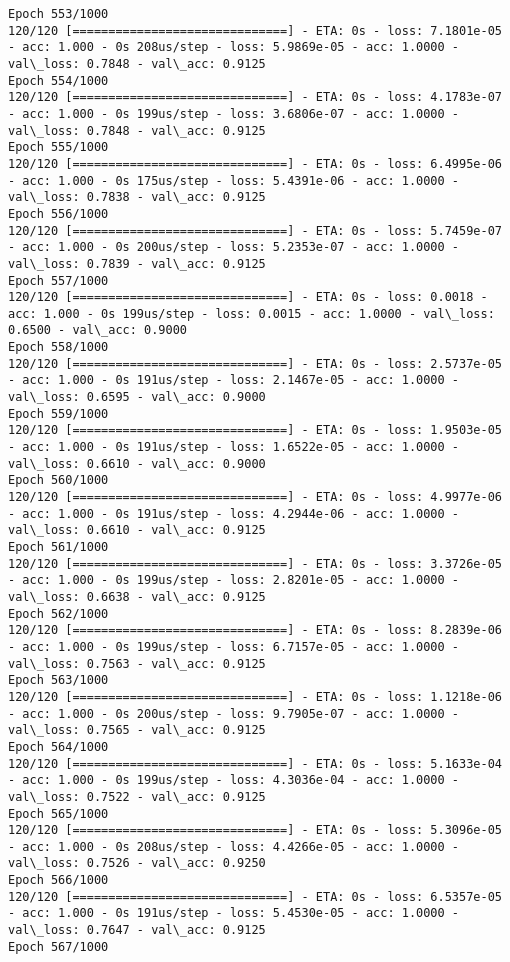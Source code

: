 \documentclass[11pt]{article}
\begin{document}
\begin{Verbatim}[commandchars=\\\{\}]
Epoch 553/1000
120/120 [==============================] - ETA: 0s - loss: 7.1801e-05 - acc: 1.000 - 0s 208us/step - loss: 5.9869e-05 - acc: 1.0000 - val\_loss: 0.7848 - val\_acc: 0.9125
Epoch 554/1000
120/120 [==============================] - ETA: 0s - loss: 4.1783e-07 - acc: 1.000 - 0s 199us/step - loss: 3.6806e-07 - acc: 1.0000 - val\_loss: 0.7848 - val\_acc: 0.9125
Epoch 555/1000
120/120 [==============================] - ETA: 0s - loss: 6.4995e-06 - acc: 1.000 - 0s 175us/step - loss: 5.4391e-06 - acc: 1.0000 - val\_loss: 0.7838 - val\_acc: 0.9125
Epoch 556/1000
120/120 [==============================] - ETA: 0s - loss: 5.7459e-07 - acc: 1.000 - 0s 200us/step - loss: 5.2353e-07 - acc: 1.0000 - val\_loss: 0.7839 - val\_acc: 0.9125
Epoch 557/1000
120/120 [==============================] - ETA: 0s - loss: 0.0018 - acc: 1.000 - 0s 199us/step - loss: 0.0015 - acc: 1.0000 - val\_loss: 0.6500 - val\_acc: 0.9000
Epoch 558/1000
120/120 [==============================] - ETA: 0s - loss: 2.5737e-05 - acc: 1.000 - 0s 191us/step - loss: 2.1467e-05 - acc: 1.0000 - val\_loss: 0.6595 - val\_acc: 0.9000
Epoch 559/1000
120/120 [==============================] - ETA: 0s - loss: 1.9503e-05 - acc: 1.000 - 0s 191us/step - loss: 1.6522e-05 - acc: 1.0000 - val\_loss: 0.6610 - val\_acc: 0.9000
Epoch 560/1000
120/120 [==============================] - ETA: 0s - loss: 4.9977e-06 - acc: 1.000 - 0s 191us/step - loss: 4.2944e-06 - acc: 1.0000 - val\_loss: 0.6610 - val\_acc: 0.9125
Epoch 561/1000
120/120 [==============================] - ETA: 0s - loss: 3.3726e-05 - acc: 1.000 - 0s 199us/step - loss: 2.8201e-05 - acc: 1.0000 - val\_loss: 0.6638 - val\_acc: 0.9125
Epoch 562/1000
120/120 [==============================] - ETA: 0s - loss: 8.2839e-06 - acc: 1.000 - 0s 199us/step - loss: 6.7157e-05 - acc: 1.0000 - val\_loss: 0.7563 - val\_acc: 0.9125
Epoch 563/1000
120/120 [==============================] - ETA: 0s - loss: 1.1218e-06 - acc: 1.000 - 0s 200us/step - loss: 9.7905e-07 - acc: 1.0000 - val\_loss: 0.7565 - val\_acc: 0.9125
Epoch 564/1000
120/120 [==============================] - ETA: 0s - loss: 5.1633e-04 - acc: 1.000 - 0s 199us/step - loss: 4.3036e-04 - acc: 1.0000 - val\_loss: 0.7522 - val\_acc: 0.9125
Epoch 565/1000
120/120 [==============================] - ETA: 0s - loss: 5.3096e-05 - acc: 1.000 - 0s 208us/step - loss: 4.4266e-05 - acc: 1.0000 - val\_loss: 0.7526 - val\_acc: 0.9250
Epoch 566/1000
120/120 [==============================] - ETA: 0s - loss: 6.5357e-05 - acc: 1.000 - 0s 191us/step - loss: 5.4530e-05 - acc: 1.0000 - val\_loss: 0.7647 - val\_acc: 0.9125
Epoch 567/1000

\end{Verbatim}
\end{document}
